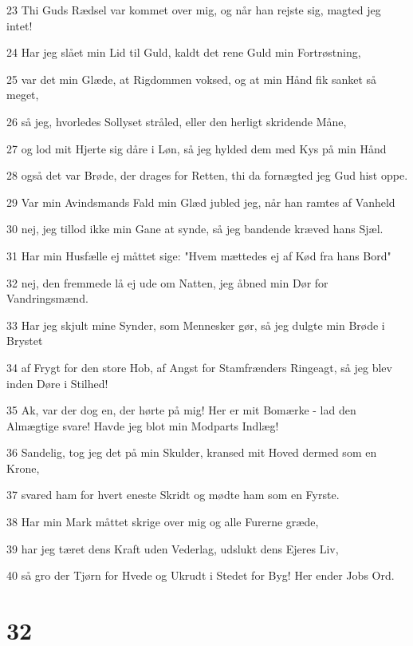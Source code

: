 \par 23 Thi Guds Rædsel var kommet over mig, og når han rejste sig, magted jeg intet!
\par 24 Har jeg slået min Lid til Guld, kaldt det rene Guld min Fortrøstning,
\par 25 var det min Glæde, at Rigdommen voksed, og at min Hånd fik sanket så meget,
\par 26 så jeg, hvorledes Sollyset stråled, eller den herligt skridende Måne,
\par 27 og lod mit Hjerte sig dåre i Løn, så jeg hylded dem med Kys på min Hånd
\par 28 også det var Brøde, der drages for Retten, thi da fornægted jeg Gud hist oppe.
\par 29 Var min Avindsmands Fald min Glæd jubled jeg, når han ramtes af Vanheld
\par 30 nej, jeg tillod ikke min Gane at synde, så jeg bandende kræved hans Sjæl.
\par 31 Har min Husfælle ej måttet sige: "Hvem mættedes ej af Kød fra hans Bord"
\par 32 nej, den fremmede lå ej ude om Natten, jeg åbned min Dør for Vandringsmænd.
\par 33 Har jeg skjult mine Synder, som Mennesker gør, så jeg dulgte min Brøde i Brystet
\par 34 af Frygt for den store Hob, af Angst for Stamfrænders Ringeagt, så jeg blev inden Døre i Stilhed!
\par 35 Ak, var der dog en, der hørte på mig! Her er mit Bomærke - lad den Almægtige svare! Havde jeg blot min Modparts Indlæg!
\par 36 Sandelig, tog jeg det på min Skulder, kransed mit Hoved dermed som en Krone,
\par 37 svared ham for hvert eneste Skridt og mødte ham som en Fyrste.
\par 38 Har min Mark måttet skrige over mig og alle Furerne græde,
\par 39 har jeg tæret dens Kraft uden Vederlag, udslukt dens Ejeres Liv,
\par 40 så gro der Tjørn for Hvede og Ukrudt i Stedet for Byg! Her ender Jobs Ord.

\chapter{32}

